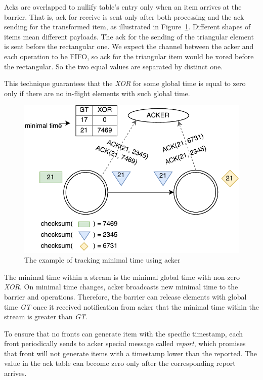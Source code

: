 Acks are overlapped to nullify table's entry only when an item arrives at the barrier. That is, ack for receive is sent only after both processing and the ack sending for the transformed item, as illustrated in Figure~\ref{acker}. Different shapes of items mean different payloads. The ack for the sending of the triangular element is sent before the rectangular one. We expect the channel between the acker and each operation to be FIFO, so ack for the triangular item would be xored before the rectangular. So the two equal values are separated by distinct one. 

This technique guarantees that the {\it XOR} for some global time is equal to zero only if there are no in-flight elements with such global time.

\begin{figure}[htbp]
  \centering
  \includegraphics[scale=0.6]{pics/acker}
  \caption{The example of tracking minimal time using acker}
  \label {acker}
\end{figure}

The minimal time within a stream is the minimal global time with non-zero {\it XOR}. On minimal time changes, acker broadcasts new minimal time to the barrier and operations. Therefore, the barrier can release elements with global time {\it GT} once it received notification from acker that the minimal time within the stream is greater than {\it GT}.

To ensure that no fronts can generate item with the specific timestamp, each front periodically sends to acker special message called {\it report}, which promises that front will not generate items with a timestamp lower than the reported. The value in the ack table can become zero only after the corresponding report arrives.

